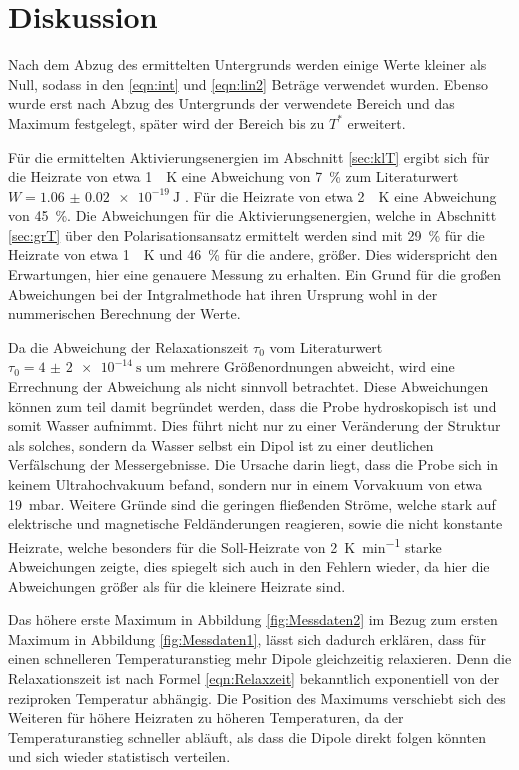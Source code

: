 \section{Diskussion}
\label{sec:Diskussion}
Nach dem Abzug des ermittelten Untergrunds werden einige Werte kleiner als Null, sodass in den \eqref{eqn:int} und \eqref{eqn:lin2} Beträge
verwendet wurden. Ebenso wurde erst nach Abzug des Untergrunds der verwendete Bereich und das Maximum festgelegt, später wird der Bereich bis zu
$T^*$ erweitert.

Für die ermittelten Aktivierungsenergien im Abschnitt \ref{sec:klT} ergibt sich für die Heizrate von etwa \SI{1}{\per\kelvin} eine 
Abweichung von \SI{7}{\percent} zum Literaturwert $W = \SI{1.06(2)e-19}{\joule}$ \cite{quelle}.
Für die Heizrate von  etwa \SI{2}{\per\kelvin} eine Abweichung von \SI{45}{\percent}. 
Die Abweichungen für die Aktivierungsenergien, welche in Abschnitt \ref{sec:grT} über den Polarisationsansatz ermittelt werden sind mit
\SI{29}{\percent} für die Heizrate von etwa \SI{1}{\per\kelvin} und \SI{46}{\percent} für die andere, größer. Dies 
widerspricht den Erwartungen, hier eine genauere Messung zu erhalten. Ein Grund für die großen Abweichungen
bei der Intgralmethode hat ihren Ursprung wohl in der nummerischen Berechnung der Werte.

Da die Abweichung der Relaxationszeit $\tau_0$ vom Literaturwert $\tau_0 = \SI{4(2)e-14}{\second}$ um mehrere Größenordnungen
abweicht, wird eine Errechnung der Abweichung als nicht sinnvoll betrachtet.
Diese Abweichungen können zum teil damit begründet werden, dass die Probe hydroskopisch ist 
und somit Wasser aufnimmt. Dies führt nicht nur zu einer Veränderung der Struktur als solches, sondern da Wasser selbst ein 
Dipol ist zu einer deutlichen Verfälschung der Messergebnisse. Die Ursache darin liegt, dass die Probe sich in keinem 
Ultrahochvakuum befand, sondern nur in einem Vorvakuum von etwa \SI{19}{\milli\bar}. 
Weitere Gründe sind die geringen fließenden Ströme, welche stark auf elektrische und magnetische Feldänderungen reagieren, sowie
die nicht konstante Heizrate, welche besonders für die Soll-Heizrate von \SI{2}{\kelvin\per\minute} starke Abweichungen zeigte, dies 
spiegelt sich auch in den Fehlern wieder, da hier die Abweichungen größer als für die kleinere Heizrate sind.


Das höhere erste Maximum in Abbildung \ref{fig:Messdaten2} im Bezug zum ersten Maximum in Abbildung \ref{fig:Messdaten1}, lässt
sich dadurch erklären, dass für einen schnelleren Temperaturanstieg mehr Dipole gleichzeitig relaxieren. Denn die Relaxationszeit
ist nach Formel \eqref{eqn:Relaxzeit} bekanntlich exponentiell von der reziproken Temperatur abhängig.
Die Position des Maximums verschiebt sich des Weiteren für höhere Heizraten zu höheren Temperaturen, da der Temperaturanstieg
schneller abläuft, als dass die Dipole direkt folgen könnten und sich wieder statistisch verteilen.

